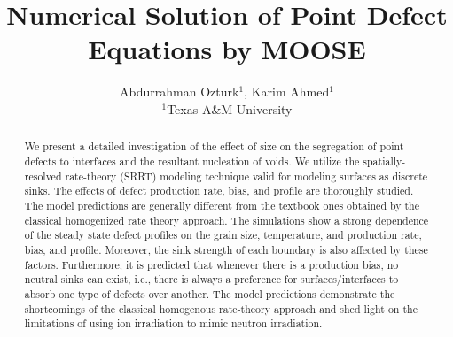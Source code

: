 \documentclass[a4paper]{article}
\title{Numerical Solution of Point Defect Equations by MOOSE}
\author{Abdurrahman Ozturk$^{1}$, Karim Ahmed$^{1}$  \\
        \small $^{1}$Texas A\&M University \\
}
\begin{document}
\maketitle

\begin{abstract}

We present a detailed investigation of the effect of size on the segregation of point defects to interfaces and the resultant nucleation of voids. We utilize the spatially-resolved rate-theory (SRRT) modeling technique valid for modeling surfaces as discrete sinks. The effects of defect production rate, bias, and profile are thoroughly studied. The model predictions are generally different from the textbook ones obtained by the classical homogenized rate theory approach. The simulations show a strong dependence of the steady state defect profiles on the grain size, temperature, and production rate, bias, and profile. Moreover, the sink strength of each boundary is also affected by these factors. Furthermore, it is predicted that whenever there is a production bias, no neutral sinks can exist, i.e., there is always a preference for surfaces/interfaces to absorb one type of defects over another. The model predictions demonstrate the shortcomings of the classical homogenous rate-theory approach and shed light on the limitations of using ion irradiation to mimic neutron irradiation.


\end{abstract} \hspace{10pt}
\end{document}

